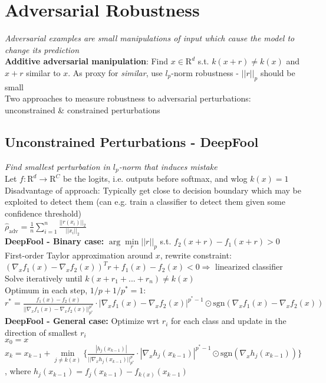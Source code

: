 \section*{Adversarial Robustness}
\textit{Adversarial examples are small manipulations of input which cause the model to change its prediction}\\
\textbf{Additive adversarial manipulation}: Find $x\in\mathrm R^d$ s.t. $k(x+r)\neq k(x)$ and $x+r$ similar to $x$. As proxy for \textit{similar}, use $l_p$-norm robustness - $||r||_p$ should be small\\
Two approaches to measure robustness to adversarial perturbations: unconstrained \& constrained perturbations
\subsection*{Unconstrained Perturbations - DeepFool}
\textit{Find smallest perturbation in $l_p$-norm that induces mistake}\\
Let $f:\mathrm R^d\rightarrow \mathrm R^C$ be the logits, i.e. outputs before softmax, and wlog $k(x)=1$\\
Disadvantage of approach: Typically get close to decision boundary which may be exploited to detect them (can e.g. train a classifier to detect them given some confidence threshold)\\
$\hat\rho_{\text{adv}}=\frac{1}{n}\sum_{i=1}^n\frac{||r(x_i)||_2}{||x_i||_2}$\\
\textbf{DeepFool - Binary case:} $\arg\underset{r}{\min} ||r||_p$ s.t. $f_2(x+r) - f_1(x+r)>0$\\
First-order Taylor approximation around $x$, rewrite constraint:\\ $(\nabla_x f_1(x)-\nabla_x f_2(x))^Tr+f_1(x)-f_2(x)<0 \Rightarrow$ linearized classifier\\
Solve iteratively until $k(x+r_1+...+r_n)\neq k(x)$\\
Optimum in each step, $1/p+1/p^*=1$: \\ $r^*=\frac{f_1(x)-f_2(x)}{||\nabla_xf_1(x)-\nabla_xf_2(x)||^{p^*}_{p^*}}\cdot|\nabla_xf_1(x)-\nabla_xf_2(x)|^{p^*-1}\odot\text{sgn}(\nabla_xf_1(x)-\nabla_xf_2(x))$\\
\textbf{DeepFool - General case:} Optimize wrt $r_i$ for each class and update in the direction of smallest $r_i$\\
$x_0=x$\\
$x_k=x_{k-1}+\underset{j\neq k(x)}{\min}\{\frac{|h_j(x_{k-1})|}{||\nabla_xh_j(x_{k-1})||^{p^*}_{p^*}}\cdot |\nabla_xh_j(x_{k-1})|^{p^*-1}\odot\text{sgn}(\nabla_xh_j(x_{k-1}))\}$, where $h_j(x_{k-1})=f_j(x_{k-1})-f_{k(x)}(x_{k-1})$
